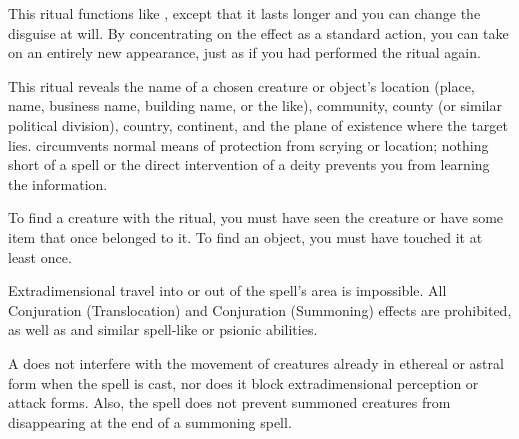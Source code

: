 \begin{spelleffect}
  This ritual functions like , except that it lasts longer and you can change the disguise at will. By concentrating on the effect as a standard action, you can take on an entirely new appearance, just as if you had performed the  ritual again.
\end{spelleffect}

\begin{spelleffect}
This ritual reveals the name of a chosen creature or object's location (place, name, business name, building name, or the like), community, county (or similar political division), country, continent, and the plane of existence where the target lies.  circumvents normal means of protection from scrying or location; nothing short of a  spell or the direct intervention of a deity prevents you from learning the information.
\par To find a creature with the ritual, you must have seen the creature or have some item that once belonged to it. To find an object, you must have touched it at least once.
\end{spelleffect}

\spellrng{\rngmed}
\begin{spelleffect}
Extradimensional travel into or out of the spell's area is impossible. All Conjuration (Translocation) and Conjuration (Summoning) effects are prohibited, as well as  and similar spell-like or psionic abilities.
\end{spelleffect}
\begin{spellnotes}
\par A  does not interfere with the movement of creatures already in ethereal or astral form when the spell is cast, nor does it block extradimensional perception or attack forms. Also, the spell does not prevent summoned creatures from disappearing at the end of a summoning spell.
\end{spellnotes}

